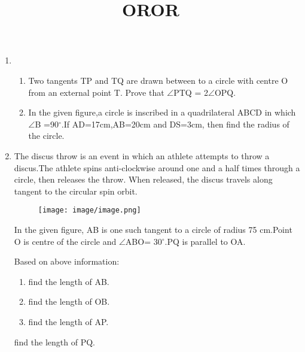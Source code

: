 \documentclass[12pt,A4 paper]{article}
\begin{document}
\begin{flushleft}
\begin{enumerate}
\pagebreak
\item
  \begin{enumerate}
    \item Two tangents TP and TQ are drawn between to a circle with centre O from an external point T. Prove that $\angle$PTQ = 2$\angle$OPQ.\\
\begin{figure}[h]
	        \centering
	        
        \end{figure}



\begin{center}
    \title{OR}
\end{center}
\item In the given figure,a circle is inscribed in a quadrilateral ABCD in which $\angle$B =90$^\circ$.If AD=17cm,AB=20cm and DS=3cm, then find the radius of the circle.

\begin{figure}[h]
	        \centering
	        
        \end{figure}
   \end{enumerate}
\item The discus throw is an event in which an athlete attempts to throw a discus.The athlete spins anti-clockwise around one and a half times through a circle, then releases the throw. When released, the discus travels along tangent to the circular spin orbit.\\


\begin{figure}[h]
	        \centering
		\texttt{[image: image/image.png]}
        \end{figure}






In the given figure, AB is one such tangent to a circle of radius 75 cm.Point O is centre of the circle and $\angle$ABO= 30$^{\circ}$.PQ is parallel to OA.\\


\begin{figure}[h]
	        \centering
	        
        \end{figure}

     
Based on above information:

           \begin{enumerate}
             \item find the length of AB.
             \item find the length of OB.
             \item find the length of AP.
         \end{enumerate}
\begin{center}
\title{OR}
\end{center}
find the length of PQ.\\


\end{enumerate}
\end{flushleft}
\end{document}
